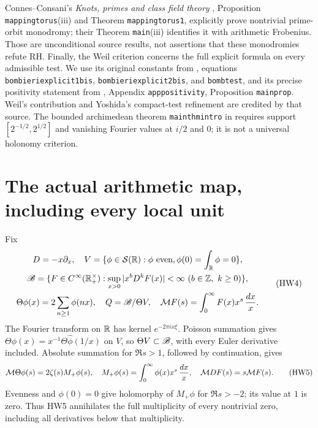 Connes--Consani's \emph{Knots, primes and class field theory}
\cite{HW-CCclass}, Proposition \texttt{mappingtorus}(iii) and
Theorem \texttt{mappingtorus1}, explicitly prove nontrivial
prime-orbit monodromy; their Theorem \texttt{main}(iii) identifies
it with arithmetic Frobenius. Those are unconditional source
results, not assertions that these monodromies refute RH.
Finally, the Weil criterion concerns the full explicit formula
on every admissible test. We use its original constants from
\cite{HW-CCcycles}, equations \texttt{bombieriexplicit1bis},
\texttt{bombieriexplicit2bis}, and \texttt{bombtest}, and its
precise positivity statement from \cite{HW-CCWeil},
Appendix \texttt{apppositivity}, Proposition \texttt{mainprop}.
Weil's contribution and Yoshida's compact-test refinement are
credited by that source. The bounded archimedean theorem
\texttt{mainthmintro} in \cite{HW-CCWeil} requires support
\([2^{-1/2},2^{1/2}]\) and vanishing Fourier values at \(i/2\)
and \(0\); it is not a universal holonomy criterion.

\section{The actual arithmetic map, including every local unit}

Fix
\[
 \begin{gathered}
 D=-x\partial_x,\quad
 V=\{\phi\in\mathcal S(\mathbb R):\phi\text{ even},
                   \phi(0)=\int_\mathbb R\phi=0\},\\
 \mathscr B=\{F\in C^\infty(\mathbb R_+^\times):
       \sup_{x>0}|x^bD^kF(x)|<\infty
                    \ (b\in\mathbb Z,\ k\ge0)\},\\
 \Theta\phi(x)=2\sum_{n\ge1}\phi(nx),\quad Q=\mathscr B/\Theta V,\quad
 \mathcal M F(s)=\int_0^\infty F(x)x^s\,\frac{dx}{x}.
 \end{gathered}
 \tag{HW4}\label{hw:spaces}
\]
The Fourier transform on \(\mathbb R\) has kernel \(e^{-2\pi ix\xi}\).
Poisson summation gives
\(\Theta\phi(x)=x^{-1}\Theta\widehat\phi(1/x)\) on \(V\),
so \(\Theta V\subset\mathscr B\), with every Euler derivative included.
Absolute summation for \(\Re s>1\), followed by continuation, gives
\[
 \mathcal M\Theta\phi(s)=2\zeta(s)M_+\phi(s),\quad
 M_+\phi(s)=\int_0^\infty\phi(x)x^s\,\frac{dx}{x},\quad
 \mathcal M DF(s)=s\mathcal M F(s).
 \tag{HW5}\label{hw:theta}
\]
Evenness and \(\phi(0)=0\) give holomorphy of \(M_+\phi\)
for \(\Re s>-2\); its value at \(1\) is zero. Thus HW5
annihilates the full multiplicity of every nontrivial zero,
including all derivatives below that multiplicity.

